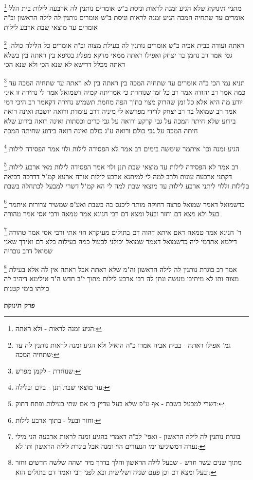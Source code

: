 \documentclass[12pt, openany]{book}
\newcommand{\sethebfont}{
\fontsize{10.5pt}{21.0pt} \selectfont
}
\newcommand{\twocol}[1]{
	{\sethebfont \begin{multicols}{2}
			#1
	\end{multicols}}	
}
\newcommand{\chapname}{}
\newcommand{\newchap}[1]{
	\addcontentsline{toc}{chapter}{#1}
	\renewcommand{\chapname}{#1}
		\begin{center}
			\textbf{%
\fontsize{16pt}{16pt}\selectfont
				#1}
		\end{center}
}
\newcommand{\footnotecomment}[1]{
	\renewcommand\thefootnote{}
	\footnote{#1}}
\newcommand{\commenta}[1]{\footnotecomment{#1}}
\begin{document}
{{\commenta{הגיע זמנה לראות - ולא ראתה:}
מתני׳ {\large\emph{תינוקת}} שלא הגיע זמנה לראות וניסת ב"ש אומרים נותנין לה ארבעה לילות בית הלל אומרים עד שתחיה המכה
הגיע זמנה לראות וניסת ב"ש אומרים נותנין לה לילה הראשון וב"ה אומרים עד מוצאי שבת ארבע לילות
\commenta{גמ' אפילו ראתה - בבית אביה אמרו ב"ה הואיל ולא הגיע זמנה לראות נותנין לה עד שתחיה המכה:}
ראתה ועודה בבית אביה ב"ש אומרים נותנין לה בעילת מצוה וב"ה אומרים כל הלילה כולה:
{\large\emph{גמ׳}} אמר רב נחמן בר יצחק ואפילו ראתה ממאי מדקא מפליג בסיפא בין ראתה בין בשלא ראתה מכלל דרישא לא שנא הכי ולא שנא הכי 
\commenta{שנוחרת - לקמן מפרש:}
תניא נמי הכי ב"ה אומרים עד שתחיה המכה בין ראתה בין לא ראתה
עד שתחיה המכה עד כמה אמר רב יהודה אמר רב כל זמן שנוחרת כי אמריתה קמיה דשמואל אמר לי נחירה זו איני יודע מה היא אלא כל זמן שהרוק מצוי בתוך הפה מחמת תשמיש 
נחירה דקאמר רב היכי דמי אמר רב שמואל בר רב יצחק לדידי מפרשא לי מיניה דרב עומדת ורואה יושבת ואינה רואה בידוע שלא חיתה המכה על גבי קרקע ורואה על גבי כרים וכסתות ואינה רואה בידוע שלא חיתה המכה על גבי כולם ורואה ע"ג כולם ואינה רואה בידוע שחיתה המכה
\commenta{עד מוצאי שבת תנן - ביום ובלילה:}
הגיע זמנה וכו' איתמר שימשה בימים רב אמר לא הפסידה לילות ולוי אמר הפסידה לילות 
\commenta{דשרי למבעל בשבת - אף ע"פ שלא בעל עדיין כי אם שתי בעילות ופתח דחוק:}
רב אמר לא הפסידה לילות עד מוצאי שבת תנן ולוי אמר הפסידה לילות מאי ארבע לילות דקתני ארבעה עונות 
ולרב למה לי למיתנא ארבע לילות אורח ארעא קמ"ל דדרכה דביאה בלילות וללוי ליתני ארבע לילות עד מוצאי שבת למה לי הא קמ"ל דשרי למבעל לכתחלה בשבת 
\commenta{וחזר ובעל - בתוך ארבע לילות:}
כדשמואל דאמר שמואל פרצה דחוקה מותר ליכנס בה בשבת ואע"פ שמשיר צרורות 
איתמר בעל ולא מצא דם וחזר ובעל ומצא דם רבי חנינא אמר טמאה ורבי אסי אמר טהורה 
\commenta{בוגרת נותנין לה לילה הראשון - ואפי' לב"ה דאמרי בהגיע זמנה לראות ארבעה הני מילי נערה דמשיגיעו ימי הנעורים הוי זמנה אבל בוגרת לילה הראשון ותו לא:}
ר' חנינא אמר טמאה דאם איתא דהוה דם בתולים מעיקרא הוי אתי ורבי אסי אמר טהורה דילמא אתרמי ליה כדשמואל דאמר שמואל יכולני לבעול כמה בעילות בלא דם ואידך שאני שמואל דרב גובריה 
\commenta{מתוך שנים עשר חדש - שבעל לילה הראשון והלך בדרך מיד ושהה שלשה חדשים וחזר ובעל ומצא דם וכן פעם שניה ושלישית ובא לפני רבי ואמר דם בתולים הוא:}
אמר רב בוגרת נותנין לה לילה הראשון וה"מ שלא ראתה אבל ראתה אין לה אלא בעילת מצוה ותו לא 
מיתיבי מעשה ונתן לה רבי ארבע לילות מתוך י"ב חדש ה"ד אילימא דיהיב לה כולהו בימי קטנות}

\newchap{פרק  תינוקת}
\twocol{\clearpage}

}
\end{document}
